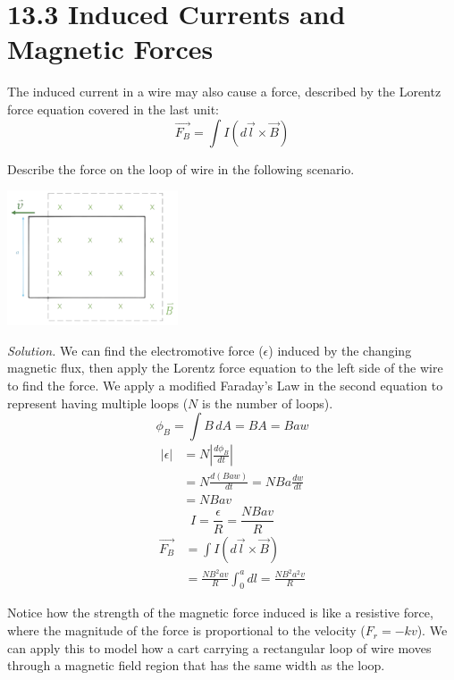 \documentclass[12pt, titlepage]{article}
\begin{document}
\section*{13.3 Induced Currents and Magnetic Forces}
The induced current in a wire may also cause a force, described by the Lorentz force equation covered in the last unit:
\begin{equation*}
    \vec{F_B} = \int I(d\vec{l} \times \vec{B})
\end{equation*}
\begin{Problem}
    Describe the force on the loop of wire in the following scenario.
    \begin{center}
        \includegraphics*[height=4cm]{media/force.png}
    \end{center}

    \textit{Solution. }We can find the electromotive force ($\epsilon$) induced by the changing magnetic flux, then apply the Lorentz force equation to the left side of the wire to find the force. We apply a modified Faraday's Law in the second equation to represent having multiple loops ($N$ is the number of loops).
    \begin{equation*}
        \phi_B=\int B \, dA = BA = Baw
    \end{equation*}
    \begin{align*}
        |\epsilon| &= N|\frac{d\phi_B}{dt}| \\
        &= N\frac{d(Baw)}{dt} = NBa\frac{dw}{dt} \\
        &= NBav
    \end{align*}
    \begin{equation*}
        I = \frac{\epsilon}{R} = \frac{NBav}{R}
    \end{equation*}
    \begin{align*}
        \vec{F_B} &= \int I (d\vec{l} \times \vec{B}) \\
        &= \frac{NB^2av}{R} \int_{0}^{a}dl= \boxed{\frac{NB^2a^2v}{R}}
    \end{align*}
\end{Problem}
Notice how the strength of the magnetic force induced is like a resistive force, where the magnitude of the force is proportional to the velocity ($F_r=-kv$). We can apply this to model how a cart carrying a rectangular loop of wire moves through a magnetic field region that has the same width as the loop.
\end{document}
